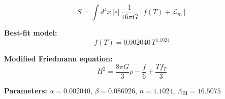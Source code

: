 
\begin{equation}
  S = \int d^4x \, |e| \, \frac{1}{16\pi G} \left[ f(T) + \mathcal{L}_m \right]
\end{equation}

\textbf{Best-fit model:}
\begin{equation}
  f(T) = 0.002040 \, T^{1.1024}
\end{equation}

\textbf{Modified Friedmann equation:}
\begin{equation}
  H^2 = \frac{8\pi G}{3} \rho - \frac{f}{6} + \frac{T f_T}{3}
\end{equation}

\textbf{Parameters:}
$\alpha = 0.002040$, \quad
$\beta = 0.086926$, \quad
$n = 1.1024$, \quad
$\Lambda_{\text{BI}} = 16.5075$